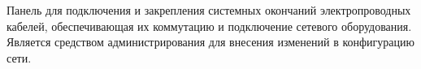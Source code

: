 Панель для подключения и закрепления системных окончаний
электропроводных кабелей, обеспечивающая их коммутацию и 
подключение сетевого оборудования. Является средством
администрирования для внесения изменений в конфигурацию сети.